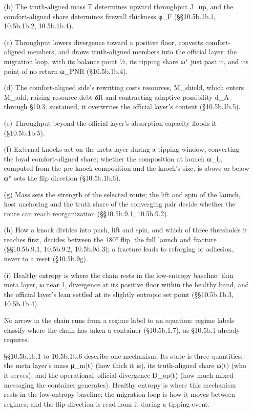 \documentclass[
]{article}
\begin{document}
(b) The truth-aligned mass T determines upward throughput J\_up, and the
comfort-aligned share determines firewall thickness φ\_F (§§10.5b.1b.1,
10.5b.1b.2, 10.5b.1b.4).

(c) Throughput lowers divergence toward a positive floor, converts
comfort-aligned members, and draws truth-aligned members into the
official layer: the migration loop, with its balance point ½, its
tipping share ω* just past it, and its point of no return ω\_PNR
(§10.5b.1b.4).

(d) The comfort-aligned side's rewriting costs resources, M\_shield,
which enters M\_add, raising resource debt δR and contracting adaptive
possibility d\_A through §10.3; sustained, it overwrites the official
layer's content (§10.5b.1b.5).

(e) Throughput beyond the official layer's absorption capacity floods it
(§10.5b.1b.5).

(f) External knocks act on the meta layer during a tipping window,
converting the loyal comfort-aligned share; whether the composition at
launch ω\_L, computed from the pre-knock composition and the knock's
size, is above or below ω* sets the flip direction (§10.5b.1b.6).

(g) Mass sets the strength of the selected route; the lift and spin of
the launch, host anchoring and the truth share of the converging pair
decide whether the route can reach reorganization (§§10.5b.9.1,
10.5b.9.2).

(h) How a knock divides into push, lift and spin, and which of three
thresholds it reaches first, decides between the 180° flip, the full
launch and fracture (§§10.5b.9.1, 10.5b.9.2, 10.5b.9d.3); a fracture
leads to reforging or adhesion, never to a reset (§10.5b.9g).

(i) Healthy entropy is where the chain rests in the low-entropy
baseline: thin meta layer, ω near 1, divergence at its positive floor
within the healthy band, and the official layer's lean settled at its
slightly entropic set point (§§10.5b.1b.3, 10.5b.1b.4).

No arrow in the chain runs from a regime label to an equation: regime
labels classify where the chain has taken a container (§10.5b.1.7), as
§10.5b.1 already requires.

§§10.5b.1b.1 to 10.5b.1b.6 describe one mechanism. Its state is three
quantities: the meta layer's mass μ\_m(t) (how thick it is), its
truth-aligned share ω(t) (who it serves), and the operational--official
divergence D\_op(t) (how much mixed messaging the container generates).
Healthy entropy is where this mechanism rests in the low-entropy
baseline; the migration loop is how it moves between regimes; and the
flip direction is read from it during a tipping event.
\end{document}
